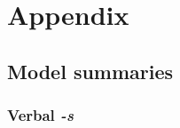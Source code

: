 \documentclass[
]{article}
\begin{document}
\newpage

\hypertarget{appendix}{%
\section{Appendix}\label{appendix}}

\hypertarget{summaries}{%
\subsection{Model summaries}\label{summaries}}

\hypertarget{verbal--s}{%
\subsubsection{\texorpdfstring{Verbal
\emph{-s}}{Verbal -s}}\label{verbal--s}}

\small
\end{document}
